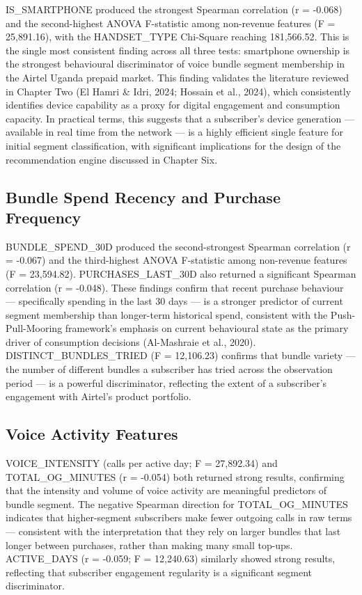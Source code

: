 IS\_SMARTPHONE produced the strongest Spearman correlation (r = -0.068) and the second-highest ANOVA F-statistic among non-revenue features (F = 25,891.16), with the HANDSET\_TYPE Chi-Square reaching 181,566.52. This is the single most consistent finding across all three tests: smartphone ownership is the strongest behavioural discriminator of voice bundle segment membership in the Airtel Uganda prepaid market. This finding validates the literature reviewed in Chapter Two (El Hamri \& Idri, 2024; Hossain et al., 2024), which consistently identifies device capability as a proxy for digital engagement and consumption capacity. In practical terms, this suggests that a subscriber's device generation --- available in real time from the network --- is a highly efficient single feature for initial segment classification, with significant implications for the design of the recommendation engine discussed in Chapter Six.


\subsection{Bundle Spend Recency and Purchase Frequency}

BUNDLE\_SPEND\_30D produced the second-strongest Spearman correlation (r = -0.067) and the third-highest ANOVA F-statistic among non-revenue features (F = 23,594.82). PURCHASES\_LAST\_30D also returned a significant Spearman correlation (r = -0.048). These findings confirm that recent purchase behaviour --- specifically spending in the last 30 days --- is a stronger predictor of current segment membership than longer-term historical spend, consistent with the Push-Pull-Mooring framework's emphasis on current behavioural state as the primary driver of consumption decisions (Al-Mashraie et al., 2020). DISTINCT\_BUNDLES\_TRIED (F = 12,106.23) confirms that bundle variety --- the number of different bundles a subscriber has tried across the observation period --- is a powerful discriminator, reflecting the extent of a subscriber's engagement with Airtel's product portfolio.


\subsection{Voice Activity Features}

VOICE\_INTENSITY (calls per active day; F = 27,892.34) and TOTAL\_OG\_MINUTES (r = -0.054) both returned strong results, confirming that the intensity and volume of voice activity are meaningful predictors of bundle segment. The negative Spearman direction for TOTAL\_OG\_MINUTES indicates that higher-segment subscribers make fewer outgoing calls in raw terms --- consistent with the interpretation that they rely on larger bundles that last longer between purchases, rather than making many small top-ups. ACTIVE\_DAYS (r = -0.059; F = 12,240.63) similarly showed strong results, reflecting that subscriber engagement regularity is a significant segment discriminator.


